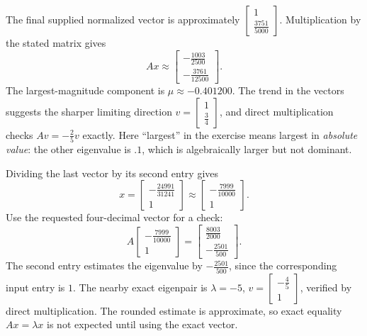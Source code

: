 The final supplied normalized vector is approximately $\left[\begin{matrix}1\\\frac{3751}{5000}\end{matrix}\right]$.
Multiplication by the stated matrix gives
\[Ax\approx\left[\begin{matrix}- \frac{1003}{2500}\\- \frac{3761}{12500}\end{matrix}\right].\]
The largest-magnitude component is $\mu\approx-0.401200$.
The trend in the vectors suggests the sharper limiting direction
$v=\left[\begin{matrix}1\\\frac{3}{4}\end{matrix}\right]$, and direct multiplication checks
$Av=- \frac{2}{5}v$ exactly.
 Here ``largest'' in the exercise means
largest in \emph{absolute value}: the other eigenvalue is $.1$, which
is algebraically larger but not dominant.

Dividing the last vector by its second entry gives
\[x=\left[\begin{matrix}- \frac{24991}{31241}\\1\end{matrix}\right]\approx\left[\begin{matrix}- \frac{7999}{10000}\\1\end{matrix}\right].\]
Use the requested four-decimal vector for a check:
\[A\left[\begin{matrix}- \frac{7999}{10000}\\1\end{matrix}\right]=\left[\begin{matrix}\frac{8003}{2000}\\- \frac{2501}{500}\end{matrix}\right].\]
The second entry estimates the eigenvalue by $- \frac{2501}{500}$,
since the corresponding input entry is $1$.
The nearby exact eigenpair is $\lambda=-5$,
$v=\left[\begin{matrix}- \frac{4}{5}\\1\end{matrix}\right]$, verified by direct multiplication.
The rounded estimate is approximate, so exact equality $Ax=\lambda x$
is not expected until using the exact vector.

